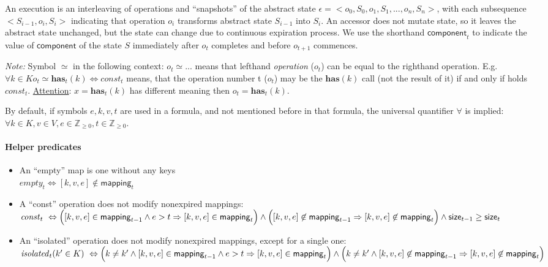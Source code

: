\documentclass{article}
\renewcommand{\o}[1]{\ensuremath{\mathbf{#1}}}
\newcommand{\p}[1]{\ensuremath{\mathit{#1}}}
\newcommand{\s}[1]{\ensuremath{\mathsf{#1}}}
\newcommand{\nintset}{\ensuremath{\mathds{Z}_{\ge 0}}}
\begin{document}
An execution is an interleaving of operations and ``snapshots'' of the abstract state
$\epsilon = <o_0, S_0, o_1, S_1, ..., o_n, S_n>$, with
each subsequence $<S_{i-1}, o_i, S_i>$ indicating that operation $o_i$ transforms abstract state $S_{i-1}$ into $S_i$.
An accessor does not mutate state, so it leaves the abstract state unchanged, but the state can change due to continuous expiration process.
We use the shorthand $\s{component}_t$ to indicate the value of \s{component} of the state $S$ immediately after $o_t$ completes and before $o_{t+1}$ commences.

{\it Note:} Symbol $\simeq$ in the following context: $o_t\simeq ...$ means that lefthand {\it operation} ($o_t$) can be equal to the righthand operation. E.g. $\forall k \in K o_t\simeq \o{has}_t(k) \Leftrightarrow \p{const}_t$ means, that the operation number t ($o_t$) may be the $\o{has}(k)$ call (not the result of it) if and only if holds $\p{const}_t$. \underline{Attention}: $x=\o{has}_t(k)$ has different meaning then $o_t=\o{has}_t(k)$.

By default, if symbols $e, k, v, t$ are used in a formula, and not mentioned before in that formula, the universal quantifier $\forall$ is implied: $\forall k \in K, v\in V, e\in \nintset, t\in \nintset$.

\paragraph{Helper predicates}
\begin{itemize}
\item An ``empty'' map is one without any keys \\
  $\p{empty}_t \Leftrightarrow [k, v, e] \not\in \s{mapping}_t$
\item A ``const'' operation does not modify nonexpired mappings:\\
  $\p{const}_t ~\Leftrightarrow~\\ \Big([k, v, e] \in \s{mapping}_{t-1} \wedge e>t \Rightarrow [k, v, e] \in \s{mapping}_t\Big)\wedge\\ \Big([k, v, e] \not\in \s{mapping}_{t-1} \Rightarrow [k, v, e] \not\in \s{mapping}_t\Big)\wedge \s{size}_{t-1} \ge \s{size}_t$
\item An ``isolated'' operation does not modify nonexpired mappings, except for a single one:\\
  $\p{isolated}_t(k'\in K) ~\Leftrightarrow~\\ \Big(k\neq k' \wedge [k, v, e] \in \s{mapping}_{t-1} \wedge e>t \Rightarrow [k, v, e] \in \s{mapping}_t\Big)\wedge\\ \Big(k\neq k' \wedge [k, v, e] \not\in \s{mapping}_{t-1} \Rightarrow [k, v, e] \not\in \s{mapping}_t\Big)$
\end{itemize}
\end{document}
